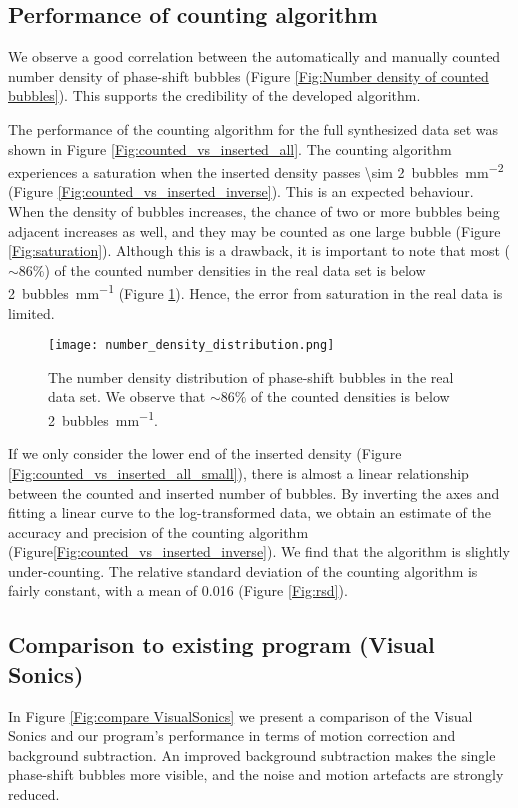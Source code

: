 \subsection{Performance of counting algorithm}

We observe a good correlation between the automatically and manually counted number density of phase-shift bubbles (Figure \ref{Fig:Number density of counted bubbles}). This supports the credibility of the developed algorithm.

The performance of the counting algorithm for the full synthesized data set was shown in Figure \ref{Fig:counted_vs_inserted_all}. The counting algorithm experiences a saturation when the inserted density passes \SI{\sim 2}{bubbles\per\milli\meter\squared} (Figure \ref{Fig:counted_vs_inserted_inverse}). This is an expected behaviour. When the density of bubbles increases, the chance of two or more bubbles being adjacent increases as well, and they may be counted as one large bubble (Figure \ref{Fig:saturation}). Although this is a drawback, it is important to note that most ($\sim 86\%$) of the counted number densities in the real data set is below \SI{2}{bubbles\per\milli\meter} (Figure \ref{Fig:number density distribution}). Hence, the error from saturation in the real data is limited.

\begin{figure}[h]
	\centering
	\texttt{[image: number\_density\_distribution.png]}
	\caption{The number density distribution of phase-shift bubbles in the real data set. We observe that $\sim 86\%$ of the counted densities is below \SI{2}{bubbles\per\milli\meter}.}
	\label{Fig:number density distribution}
\end{figure} 


If we only consider the lower end of the inserted density (Figure \ref{Fig:counted_vs_inserted_all_small}), there is almost a linear relationship between the counted and inserted number of bubbles. By inverting the axes and fitting a linear curve to the log-transformed data, we obtain an estimate of the accuracy and precision of the counting algorithm (Figure\ref{Fig:counted_vs_inserted_inverse}). We find that the algorithm is slightly under-counting. The relative standard deviation of the counting algorithm is fairly constant, with a mean of 0.016 (Figure \ref{Fig:rsd}).

\subsection{Comparison to existing program (Visual Sonics)}
In Figure \ref{Fig:compare VisualSonics} we present a comparison of the Visual Sonics and our program's performance in terms of motion correction and background subtraction. An improved background subtraction makes the single phase-shift bubbles more visible, and the noise and motion artefacts are strongly reduced.

